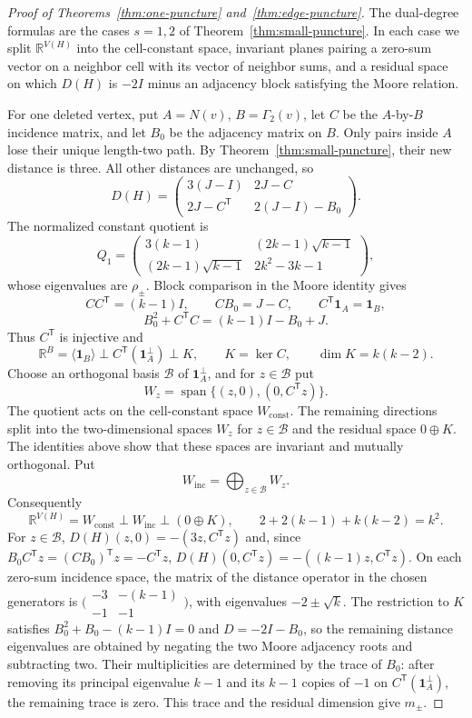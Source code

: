 \documentclass[a4paper,10pt,reqno]{amsart}
\theoremstyle{plain}
\theoremstyle{definition}
\theoremstyle{remark}
\newcommand{\one}{\mathbf 1}
\begin{document}
\begin{proof}[Proof of Theorems~\ref{thm:one-puncture}
and~\ref{thm:edge-puncture}]
The dual-degree formulas are the cases \(s=1,2\) of
Theorem~\ref{thm:small-puncture}. In each case we split
\(\mathbb R^{V(H)}\) into the cell-constant space, invariant planes pairing a
zero-sum vector on a neighbor cell with its vector of neighbor sums, and a
residual space on which \(D(H)\) is \(-2I\) minus an adjacency block
satisfying the Moore relation.

For one deleted vertex, put \(A=N(v)\),
\(B=\Gamma_2(v)\), let \(C\) be
the \(A\)-by-\(B\) incidence matrix, and let \(B_0\) be the adjacency
matrix on \(B\).  Only pairs inside \(A\) lose their unique length-two path.
By Theorem~\ref{thm:small-puncture}, their new distance is three.
All other distances are unchanged, so
\[
 D(H)=\begin{pmatrix}3(J-I)&2J-C\\2J-C^{\mathsf T}&2(J-I)-B_0\end{pmatrix}.
\]
The normalized constant quotient is
\[
 Q_1=\begin{pmatrix}
 3(k-1)&(2k-1)\sqrt{k-1}\\
 (2k-1)\sqrt{k-1}&2k^2-3k-1
 \end{pmatrix},
\]
whose eigenvalues are \(\rho_\pm\).  Block comparison in the Moore identity
gives
\[
 CC^{\mathsf T}=(k-1)I,\qquad
 CB_0=J-C,\qquad
 C^{\mathsf T}\one_A=\one_B,
\]
\[
 B_0^2+C^{\mathsf T}C=(k-1)I-B_0+J.
\]
Thus \(C^{\mathsf T}\) is injective and
\[
 \mathbb R^B=
 \langle\one_B\rangle\perp
 C^{\mathsf T}(\one_A^\perp)\perp K,
 \qquad K=\ker C,\qquad \dim K=k(k-2).
\]
Choose an orthogonal basis \(\mathcal B\) of \(\one_A^\perp\), and for
\(z\in\mathcal B\) put
\[
 W_z=\operatorname{span}\{(z,0),(0,C^{\mathsf T}z)\}.
\]
The quotient acts on the cell-constant space \(W_{\mathrm{const}}\).
The remaining directions split into the two-dimensional spaces \(W_z\)
for \(z\in\mathcal B\) and the residual space \(0\oplus K\).
The identities above show that these spaces are invariant and mutually
orthogonal.  Put
\[
 W_{\mathrm{inc}}=\bigoplus_{z\in\mathcal B}W_z.
\]
Consequently
\[
\mathbb R^{V(H)}=W_{\mathrm{const}}\perp W_{\mathrm{inc}}\perp(0\oplus K),
 \qquad 2+2(k-1)+k(k-2)=k^2.
\]
For \(z\in\mathcal B\), \(D(H)(z,0)=-(3z,C^{\mathsf T}z)\) and, since
\(B_0C^{\mathsf T}z=(CB_0)^{\mathsf T}z=-C^{\mathsf T}z\),
\(D(H)(0,C^{\mathsf T}z)=-((k-1)z,C^{\mathsf T}z)\).
On each zero-sum incidence space, the matrix of the distance operator in the chosen generators is
\(\bigl(\begin{smallmatrix}-3&-(k-1)\\-1&-1\end{smallmatrix}\bigr)\),
with eigenvalues \(-2\pm\sqrt{k}\).  The restriction to \(K\) satisfies
\(B_0^2+B_0-(k-1)I=0\) and \(D=-2I-B_0\), so the remaining distance eigenvalues
are obtained by negating the two Moore adjacency roots and subtracting two.  Their multiplicities are determined by the trace of \(B_0\):
after removing its principal eigenvalue \(k-1\) and its \(k-1\) copies
of \(-1\) on \(C^{\mathsf T}(\one_A^\perp)\), the remaining trace is
zero.  This trace and the residual dimension give \(m_\pm\).


\end{proof}
\end{document}
